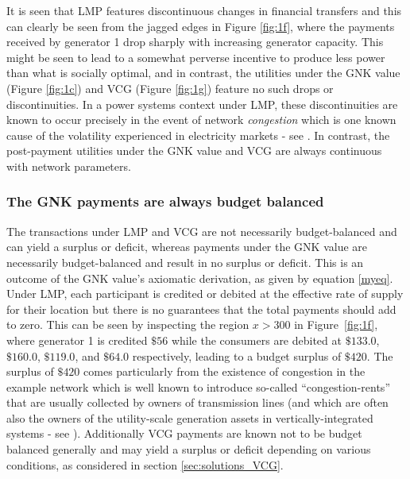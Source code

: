 It is seen that LMP features discontinuous changes in financial transfers and this can clearly be seen from the jagged edges in Figure \ref{fig:1f}, where the payments received by generator 1 drop sharply with increasing generator capacity.
This might be seen to lead to a somewhat perverse incentive to produce less power than what is socially optimal, and in contrast, the utilities under the GNK value (Figure \ref{fig:1c}) and VCG  (Figure \ref{fig:1g}) feature no such drops or discontinuities.
In a power systems context under LMP, these discontinuities are known to occur precisely in the event of network \emph{congestion}
which is one known cause of the volatility experienced in electricity markets - see \cite{RePEc:aen:journl:2006v27-02-a09}. 
In contrast, the post-payment utilities under the GNK value and VCG are always continuous with network parameters.



\subsubsection*{The GNK payments are always budget balanced}
The transactions under LMP and VCG are not necessarily budget-balanced and can yield a surplus or deficit, whereas payments under the GNK value are necessarily budget-balanced and result in no surplus or deficit.
This is an outcome of the GNK value's axiomatic derivation, as given by equation \eqref{myeq}.
Under LMP, each participant is credited or debited at the effective rate of supply for their location but there is no guarantees that the total payments should add to zero.
This can be seen by inspecting the region $x>300$ in Figure~\ref{fig:1f}, where generator 1 is credited $\$56$ while the consumers are debited at $\$133.0$, $\$160.0$, $\$119.0$, and $\$64.0$ respectively, leading to a budget surplus of $\$420$.
The surplus of $\$420$ comes particularly from the existence of congestion in the example network which is well known to introduce so-called ``congestion-rents'' that are usually collected by owners of transmission lines (and which are often also the owners of the utility-scale generation assets in vertically-integrated systems - see \cite{lmp2}).
Additionally VCG payments are known not to be budget balanced generally and may yield a surplus or deficit depending on various conditions, as considered in section \ref{sec:solutions_VCG}.

